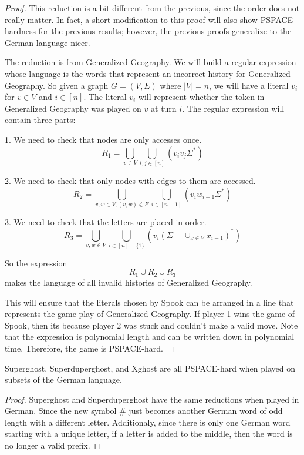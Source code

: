 \documentclass[runningheads,a4paper]{llncs}
\begin{document}
\begin{proof}
This reduction is a bit different from the previous, since the order does not really matter. In fact, a short modification to this proof will also show PSPACE-hardness for the previous results; however, the previous proofs generalize to the German language nicer. 

The reduction is from Generalized Geography. We will build a regular expression whose language is the words that represent an incorrect history for Generalized Geography. So given a graph $G = (V, E)$ where $|V| = n$, we will have a literal $v_i$ for $v \in V$ and $i \in [n]$. The literal $v_i$ will represent whether the token in Generalized Geography was played on $v$ at turn $i$. The regular expression will contain three parts:

1. We need to check that nodes are only accesses once.
\[ R_1 = \bigcup_{v\in V} \bigcup_{i,j\in [n]}(v_iv_j \Sigma^*) \]

2. We need to check that only nodes with edges to them are accessed.
\[ R_2 = \bigcup_{v, w \in V, (v,w) \notin E} \bigcup_{i \in [n-1]} (v_iw_{i+1}\Sigma^*) \]

3. We need to check that the letters are placed in order.
\[ R_3 = \bigcup_{v, w \in V} \bigcup_{i \in [n] - \{1\}} \left(v_i(\Sigma - \cup_{x \in V} x_{i-1})^* \right) \]

So the expression 
\[ R_1 \cup R_2 \cup R_3 \]
makes the language of all invalid histories of Generalized Geography.

This will ensure that the literals chosen by Spook can be arranged in a line that represents the game play of Generalized Geography. If player 1 wins the game of Spook, then its because player 2 was stuck and couldn't make a valid move. Note that the expression is polynomial length and can be written down in polynomial time. Therefore, the game is PSPACE-hard. 
\end{proof}

\begin{corollary}
Superghost, Superduperghost, and Xghost are all PSPACE-hard when played on subsets of the German language.
\end{corollary}

\begin{proof}
Superghost and Superduperghost have the same reductions when played in German. Since the new symbol \# just becomes another German word of odd length with a different letter. Additionaly, since there is only one German word starting with a unique letter, if a letter is added to the middle, then the word is no longer a valid prefix. 
\end{proof}
\end{document}

